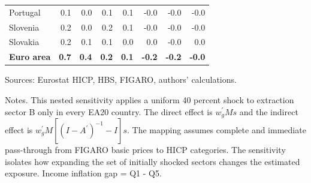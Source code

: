 \documentclass[11pt]{article}
\begin{document}
\begin{table}[H]
\begin{tabular}{lrrrrrrr}
Portugal & 0.1 & 0.0 & 0.1 & 0.1 & -0.0 & -0.0 & -0.0
 \\
Slovenia & 0.2 & 0.0 & 0.2 & 0.1 & -0.0 & -0.0 & -0.0
 \\
Slovakia & 0.2 & 0.1 & 0.1 & 0.0 & 0.0 & -0.0 & 0.0
 \\
\midrule
\textbf{Euro area} & \textbf{0.7} & \textbf{0.4} & \textbf{0.2} & \textbf{0.1} & \textbf{-0.2} & \textbf{-0.2} & \textbf{-0.0}
 \\
\bottomrule
\end{tabular}
\par\vspace{0.35em}\footnotesize\noindent Sources: Eurostat HICP, HBS, FIGARO, authors' calculations.
\par\vspace{0.25em}\footnotesize\noindent Notes. This nested sensitivity applies a uniform 40 percent shock to extraction sector B only in every EA20 country. The direct effect is $w_g^{\prime}Ms$ and the indirect effect is $w_g^{\prime}M[(I-A^{\prime})^{-1}-I]s$. The mapping assumes complete and immediate pass-through from FIGARO basic prices to HICP categories. The sensitivity isolates how expanding the set of initially shocked sectors changes the estimated exposure. Income inflation gap = Q1 - Q5.
\end{table}
\vspace{0.6em}
\end{document}
